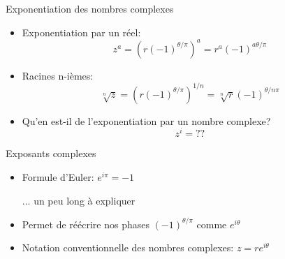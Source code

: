 \documentclass[aspectratio=169,12pt]{beamer}
\begin{document}
\begin{frame}{Exponentiation des nombres complexes}

  \begin{center}
  \begin{itemize}
    \item Exponentiation par un réel:
    \begin{equation*}
      z^a = \left( r (-1)^{\theta/\pi} \right)^a = r^a (-1)^{a\theta/\pi}
    \end{equation*}
    \item Racines n-ièmes:
    \begin{equation*}
      \sqrt[n]{z} = \left( r (-1)^{\theta/\pi} \right) ^{1/n} = \sqrt[n]{r} (-1)^{\theta/n\pi}
    \end{equation*}
    \bigskip
    \item Qu'en est-il de l'exponentiation par un nombre complexe?
    \begin{equation*}
      z^i = ??
    \end{equation*}
  \end{itemize}
  \end{center}

\end{frame}

\begin{frame}{Exposants complexes}

  \begin{center}
  \begin{itemize}
    \item Formule d'Euler: \hspace{5mm} $\boxed{e^{i\pi} = -1}$ 
    \begin{flushright}
      ... un peu long à expliquer
    \end{flushright}
    \bigskip
    \item Permet de réécrire nos phases $(-1)^{\theta/\pi}$ comme $e^{i\theta}$ %
    \bigskip
    \item Notation conventionnelle des nombres complexes: \hspace{5mm} $\boxed{z = r e^{i\theta}}$
  \end{itemize}
  \end{center}

\end{frame}
\end{document}
